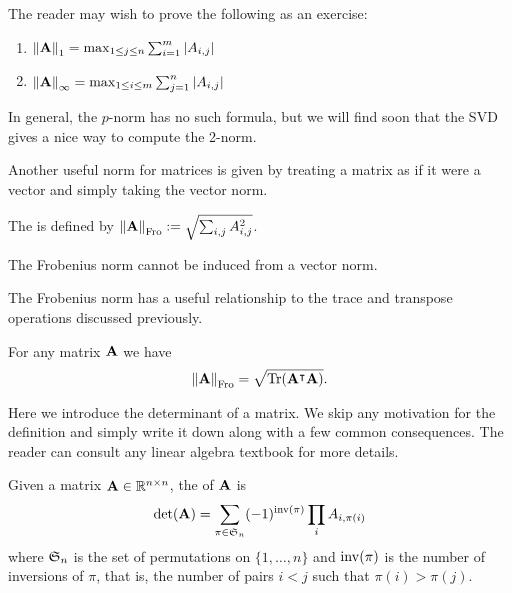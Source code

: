 \begin{example}
    The reader may wish to prove the following as an exercise:
    \begin{enumerate}
        \item $\norm{\MA}_1 = \max_{1 \leq j \leq n} \sum_{i = 1}^m |A_{i,j}|$
        \item $\norm{\MA}_{\infty} = \max_{1 \leq i \leq m} \sum_{j = 1}^n |A_{i,j}|$
    \end{enumerate}
    In general, the $p$-norm has no such formula, but we will find soon that the SVD gives a nice way to compute the 2-norm.
\end{example}

Another useful norm for matrices is given by treating a matrix as if it were a vector and simply taking the vector norm.

\begin{definition}
The  is defined by
$\norm{\MA}_\Fro := \sqrt{\sum_{i,j} A_{i,j}^2}$.
\end{definition}

\begin{note}
The Frobenius norm cannot be induced from a vector norm.
\end{note}

The Frobenius norm has a useful relationship to the trace and transpose operations discussed previously.

\begin{proposition}
For any matrix $\MA$ we have
$$\norm{\MA}_\Fro  = \sqrt{\trace(\MA^\intercal\MA)}.$$
\end{proposition}


Here we introduce the determinant of a matrix. We skip any motivation for the definition and simply write it down along with a few common consequences. The reader can consult any linear algebra textbook for more details.

\begin{definition}
Given a matrix $\MA \in \mathbb R^{n \times n}$, the  of $\MA$ is
$$\det(\MA) = \sum_{\pi \in \FS_n} (-1)^{\inv(\pi)} \prod_i A_{i, \pi(i)}$$
where $\FS_n$ is the set of permutations on $\{1,\dots,n\}$ and $\inv(\pi)$ is the number of inversions of $\pi$, that is, the number of pairs $i<j$ such that $\pi(i)>\pi(j)$.
\end{definition}

